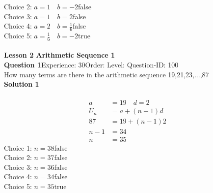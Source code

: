 \documentclass{article}
\begin{document}
Choice 2: \hspace{20pt}$a=1 \quad b=-2$\hspace{20pt}false\\
Choice 3: \hspace{20pt}$a=1 \quad b=2$\hspace{20pt}false\\
Choice 4: \hspace{20pt}$a=2 \quad b=\displaystyle\frac{1}{6}$\hspace{20pt}false\\
Choice 5: \hspace{20pt}$a=\displaystyle\frac{1}{6} \quad b=-2$\hspace{20pt}true\\
\\[4pt]
\noindent\huge{\textbf{Lesson 2 Arithmetic Sequence 1}}\\[12pt]
\noindent\textbf{Question 1}\hspace{20pt}Experience: 30\hspace{20pt}Order: \hspace{20pt}Level: \hspace{20pt}Question-ID: 100\\[2pt]
How many terms are there in the arithmetic sequence 19,21,23,...,87\\[4pt]
\noindent\textbf{Solution 1}\\[2pt]
\\[-35pt]\begin{align*}
a&=19 \quad d=2\\[2pt]
U_n&=a+(n-1)d\\[2pt]
87&=19+(n-1)2\\[2pt]
n-1&=34\\[2pt]
n&=35
\end{align*}
Choice 1: \hspace{20pt}$n=38$\hspace{20pt}false\\
Choice 2: \hspace{20pt}$n=37$\hspace{20pt}false\\
Choice 3: \hspace{20pt}$n=36$\hspace{20pt}false\\
Choice 4: \hspace{20pt}$n=34$\hspace{20pt}false\\
Choice 5: \hspace{20pt}$n=35$\hspace{20pt}true\\
\end{document}
